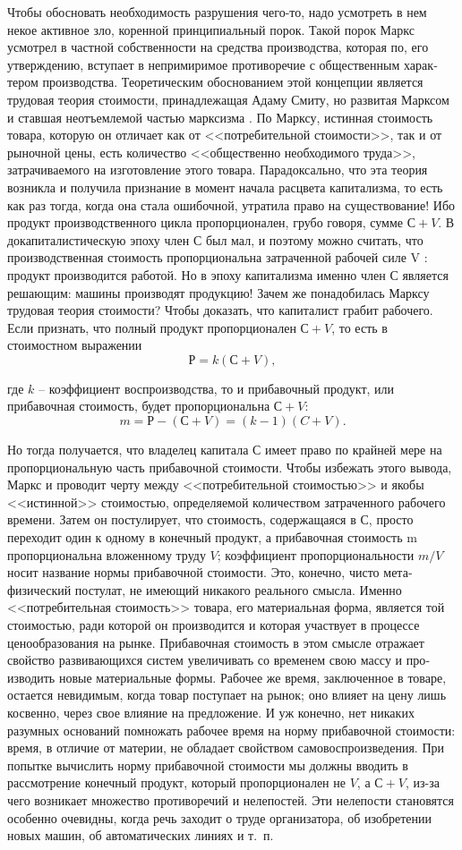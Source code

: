 \documentclass{book}
\begin{document}
Чтобы обосновать необходимость разрушения чего-то, надо усмотреть в нем некое активное зло, коренной принципиаль­ный порок. Такой порок Маркс усмотрел в частной собствен­ности на средства производства, которая по, его утверждению, вступает в непримиримое противоречие с общественным харак­тером производства. Теоретическим обоснованием этой кон­цепции является трудовая теория стоимости, принадлежащая Адаму Смиту, но развитая Марксом и ставшая неотъемлемой частью марксизма . По Марксу, истинная стоимость товара, которую он отличает как от <<потребительной стоимости>>, так и от рыночной цены, есть количество <<общественно необходи­мого труда>>, затрачиваемого на изготовление этого товара. Парадоксально, что эта теория возникла и получила призна­ние в момент начала расцвета капитализма, то есть как раз тогда, когда она стала ошибочной, утратила право на сущест­вование! Ибо продукт производственного цикла пропорционален, грубо говоря, сумме $С + V$. В докапиталистическую эпоху член $С$ был мал, и поэтому можно 
считать,
 что произ­водственная стоимость пропорциональна затраченной рабочей силе V : продукт производится работой. Но в эпоху капитализ­ма именно член $С$ является решающим: машины производят продукцию! Зачем же понадобилась Марксу трудовая теория стоимости? Чтобы доказать, что капиталист грабит  рабочего. Если признать, что полный продукт пропорционален $С + V$, то есть в стоимостном выражении
\[
	Р = k(С + V),
\]

где $k$ -- коэффициент воспроизводства, то и прибавочный продукт, или прибавочная стоимость, будет пропорциональ­на $С + V$:
\[
	m=Р-(С+V)=(k-1)(C+V).
\]

Но тогда получается, что владелец капитала С имеет право по крайней мере на пропорциональную часть прибавочной стои­мости. Чтобы избежать этого вывода, Маркс и проводит черту между <<потребительной стоимостью>> и якобы <<истинной>> стоимостью, определяемой количеством затраченного рабочего времени. Затем он постулирует, что стоимость, содержащаяся в $С$, просто переходит один к одному в конечный продукт, а прибавочная стоимость m  пропорциональна вложенному труду $V$; коэффициент пропорциональности $m/V$ носит назва­ние нормы прибавочной стоимости. Это, конечно, чисто мета­физический постулат, не имеющий никакого реального смысла. Именно <<потребительная стоимость>> товара, его материальная форма, является той стоимостью, ради которой он производит­ся и которая участвует в процессе ценообразования на рынке. Прибавочная стоимость в этом смысле отражает свойство раз­вивающихся систем увеличивать со временем свою массу и про­изводить новые материальные формы. Рабочее же время, заклю­ченное в товаре, остается 
невидимым, когда товар поступает на рынок; оно влияет на цену лишь косвенно, через свое влия­ние на предложение. И уж конечно, нет никаких разумных ос­нований помножать рабочее время на норму прибавочной сто­имости: время, в отличие от материи, не обладает свойством самовоспроизведения. При попытке вычислить норму приба­вочной стоимости мы должны вводить в рассмотрение конечный продукт, который пропорционален не $V$, а $С + V$, из-за чего возникает множество противоречий и нелепостей. Эти не­лепости становятся особенно очевидны, когда речь заходит о труде организатора, об изобретении новых машин, об автоматических линиях и т.~п.
\end{document}
